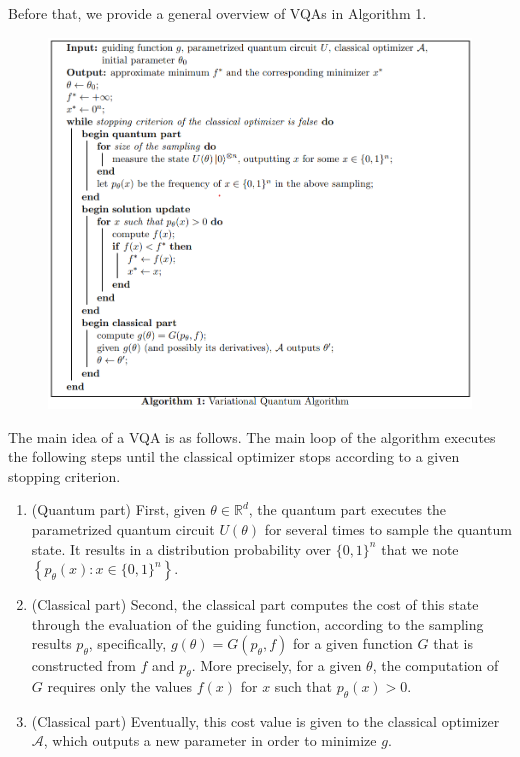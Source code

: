 Before that, we provide a general overview of VQAs in Algorithm 1.
\begin{figure}
    \centering
    \includegraphics[width=1\linewidth]{VQA-algorithm.png}
\end{figure}

The main idea of a VQA is as follows. The main loop of the algorithm executes the following steps until the classical optimizer stops according to a given stopping criterion. 

\begin{enumerate}
    \item (Quantum part) First, given $\theta \in \mathbb{R}^{d}$, the quantum part executes the parametrized quantum circuit $U(\theta)$ for several times to sample the quantum state. It results in a distribution probability over $\{0,1\}^{n}$ that we note $\left\{p_{\theta}(x): x \in\{0,1\}^{n}\right\}$. %
    \item (Classical part) Second, the classical part computes the cost of this state through the evaluation of the guiding function, according to the sampling results $p_{\theta}$, specifically, $g(\theta)=G\left(p_{\theta}, f\right)$ for a given function $G$ that is constructed from $f$ and $p_{\theta}$. More precisely, for a given $\theta$, the computation of $G$ requires only the values $f(x)$ for $x$ such that $p_{\theta}(x)>0$. %
    \item (Classical part) Eventually, this cost value is given to the classical optimizer $\mathcal{A}$, which outputs a new parameter in order to minimize $g$. %
\end{enumerate}

